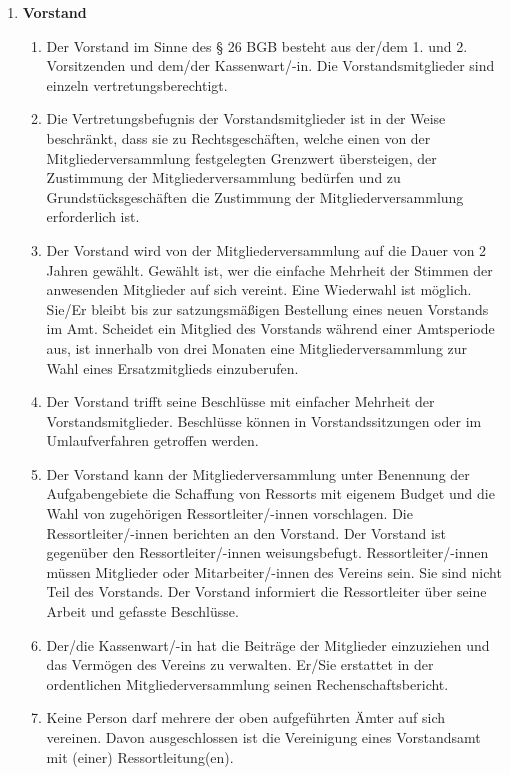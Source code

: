 \documentclass{article}
\begin{document}
\begin{enumerate}[§ 1.]
\item \textsf{\textbf{Vorstand}}
	\begin{enumerate}[1.]	
	\item Der Vorstand im Sinne des § 26 BGB besteht aus der/dem 1. und 2. Vorsitzenden und dem/der Kassenwart/-in.
	Die Vorstandsmitglieder sind einzeln vertretungsberechtigt.
	\item Die Vertretungsbefugnis der Vorstandsmitglieder ist in der Weise beschränkt, dass sie zu Rechtsgeschäften, welche einen von der Mitgliederversammlung festgelegten Grenzwert übersteigen, der Zustimmung der Mitgliederversammlung bedürfen und zu Grundstücksgeschäften die Zustimmung der Mitgliederversammlung erforderlich ist.
	\item Der Vorstand wird von der Mitgliederversammlung auf die Dauer von 2 Jahren gewählt.
	Gewählt ist, wer die einfache Mehrheit der Stimmen der anwesenden Mitglieder auf sich vereint.
	Eine Wiederwahl ist möglich. Sie/Er bleibt bis zur satzungsmäßigen Bestellung eines neuen Vorstands im Amt.
	Scheidet ein Mitglied des Vorstands während einer Amtsperiode aus,
	ist innerhalb von drei Monaten eine Mitgliederversammlung zur Wahl eines Ersatzmitglieds einzuberufen.
	\item Der Vorstand trifft seine Beschlüsse mit einfacher Mehrheit der Vorstandsmitglieder. Beschlüsse können in Vorstandssitzungen oder im Umlaufverfahren getroffen werden.
	\item Der Vorstand kann der Mitgliederversammlung unter Benennung der Aufgabengebiete die Schaffung von Ressorts mit eigenem Budget und die Wahl von zugehörigen Ressortleiter/-innen vorschlagen. Die Ressortleiter/-innen berichten an den Vorstand. Der Vorstand ist gegenüber den Ressortleiter/-innen weisungsbefugt. Ressortleiter/-innen müssen Mitglieder oder Mitarbeiter/-innen des Vereins sein. Sie sind nicht Teil des Vorstands. Der Vorstand informiert die Ressortleiter über seine Arbeit und gefasste Beschlüsse.  
	\item Der/die Kassenwart/-in hat die Beiträge der Mitglieder einzuziehen und das Vermögen des Vereins zu verwalten. Er/Sie erstattet in der ordentlichen Mitgliederversammlung seinen Rechenschaftsbericht.
	\item Keine Person darf mehrere der oben aufgeführten Ämter auf sich vereinen. Davon ausgeschlossen ist die Vereinigung eines Vorstandsamt mit (einer) Ressortleitung(en).
	\end{enumerate}


\end{enumerate}
\end{document}
